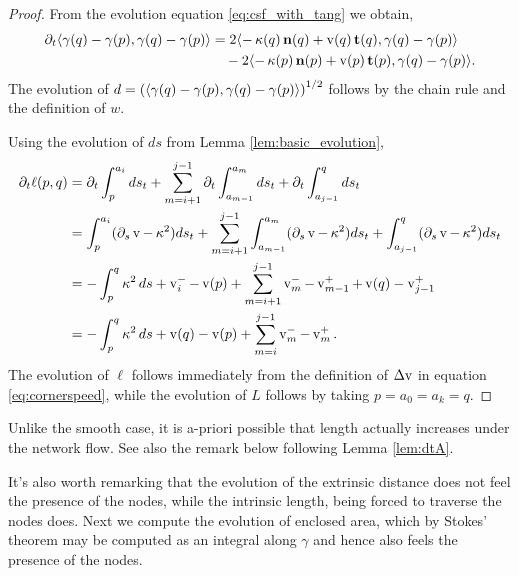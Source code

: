 \documentclass[12pt]{amsart}
\begin{document}
\begin{proof}
From the evolution equation \eqref{eq:csf_with_tang} we obtain,
\[
\begin{split}
\partial_t \langle{\gamma(q) - \gamma(p)},{\gamma(q) - \gamma(p)}\rangle &= 2 \langle{-\operatorname{\kappa}(q) \operatorname{\mathbf{n}}(q) + \operatorname{v}(q) \operatorname{\mathbf{t}}(q)},{\gamma(q) - \gamma(p)}\rangle \\
&\quad  - 2 \langle{-\operatorname{\kappa}(p) \operatorname{\mathbf{n}}(p) + \operatorname{v}(p) \operatorname{\mathbf{t}}(p)},{\gamma(q) - \gamma(p)}\rangle.
\end{split}
\]
The evolution of \(d = \left(\langle{\gamma(q) - \gamma(p)},{\gamma(q) - \gamma(p)}\rangle\right)^{1/2}\) follows by the chain rule and the definition of \(w\).

Using the evolution of \(ds\) from Lemma \ref{lem:basic_evolution},
\begin{align*}
\partial_t \ell(p,q) &= \partial_t \int_p^{a_i} ds_t + \sum_{m=i+1}^{j-1} \partial_t \int_{a_{m-1}}^{a_m} ds_t + \partial_t  \int_{a_{j-1}}^q ds_t \\
&= \int_p^{a_i} (\partial_s \operatorname{v} - \operatorname{\kappa}^2 )ds_t + \sum_{m=i+1}^{j-1} \int_{a_{m-1}}^{a_m} (\partial_s \operatorname{v} - \operatorname{\kappa}^2 )ds_t + \int_{a_{j-1}}^q (\partial_s \operatorname{v} - \operatorname{\kappa}^2) ds_t \\
&= -\int_p^q \operatorname{\kappa}^2 ds + \operatorname{v}_i^- - \operatorname{v}(p) + \sum_{m=i+1}^{j-1} \operatorname{v}_m^- - \operatorname{v}_{m-1}^+ + \operatorname{v}(q) - \operatorname{v}_{j-1}^+ \\
&= -\int_p^q \operatorname{\kappa}^2 ds + \operatorname{v}(q) - \operatorname{v}(p) + \sum_{m=i}^{j-1} \operatorname{v}_m^- - \operatorname{v}_m^+.
\end{align*}
The evolution of \(\ell\) follows immediately from the definition of \(\operatorname{{\Delta v}}\) in equation \eqref{eq:cornerspeed}, while the evolution of \(L\) follows by taking \(p=a_0=a_k=q\).
\end{proof}

\begin{remark}
Unlike the smooth case, it is a-priori possible that length actually increases under the network flow. See also the remark below following Lemma \ref{lem:dtA}.
\end{remark}

It's also worth remarking that the evolution of the extrinsic distance does not feel the presence of the nodes, while the intrinsic length, being forced to traverse the nodes does. Next we compute the evolution of enclosed area, which by Stokes' theorem may be computed as an integral along \(\gamma\) and hence also feels the presence of the nodes.
\end{document}

